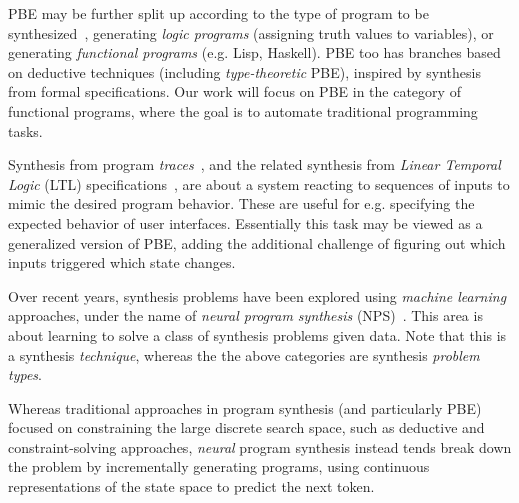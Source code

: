\documentclass{article}
\begin{document}
PBE may be further split up according to the type of program to be synthesized~\citep{bodik2013algorithmic},
generating \emph{logic programs} (assigning truth values to variables),
or generating \emph{functional programs} (e.g. Lisp, Haskell).
PBE too has branches based on deductive techniques (including \emph{type-theoretic} PBE),
inspired by synthesis from formal specifications.
Our work will focus on PBE in the category of functional programs,
where the goal is to automate traditional programming tasks.


Synthesis from program \emph{traces}~\citep{koskimies1994automatic},
and the related synthesis from \emph{Linear Temporal Logic} (LTL)
specifications~\citep{camacho2019towards}, are about
a system reacting to sequences of inputs to mimic the desired program behavior.
These are useful for e.g. specifying the expected behavior of user interfaces.
Essentially this task may be viewed as a generalized version of PBE,
adding the additional challenge of figuring out which inputs triggered which state changes.


Over recent years, synthesis problems have been explored using \emph{machine learning} approaches,
under the name of \emph{neural program synthesis} (NPS)~\citep{nps}.
This area is about learning to solve a class of synthesis problems given data.
Note that this is a synthesis \emph{technique}, whereas the the above categories are synthesis \emph{problem types}.

Whereas traditional approaches in program synthesis (and particularly PBE) focused on constraining the large discrete search space,
such as deductive and constraint-solving approaches,
\emph{neural} program synthesis instead tends break down the problem by incrementally generating programs,
using continuous representations of the state space to predict the next token.
\end{document}
